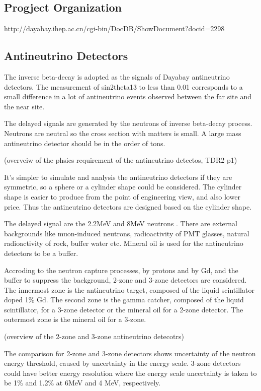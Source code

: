 \subsection{Progject Organization}

http://dayabay.ihep.ac.cn/cgi-bin/DocDB/ShowDocument?docid=2298

\subsection{Antineutrino Detectors}

The inverse beta-decay is adopted as the signals of Dayabay antineutrino detectors.
The measurement of sin2theta13 to less than 0.01 corresponds to a small
difference in a lot of antineutrino events observed between the far site and
the near site.

The delayed signals are generated by the neutrons of inverse beta-decay process.
Neutrons are neutral so the cross section with matters is small.
A large mass antineutrino detector should be in the order of tons.



(overveiw of the phsics requirement of the antineutrino detectos, TDR2 p1)

It's simpler to simulate and analysis the antineutrino detectors if they are
symmetric, so a sphere or a cylinder shape could be considered. The cylinder
shape is easier to produce from the point of engineering view, and also lower
price. Thus the antineutrino detectors are designed based on the cylinder shape.

The delayed signal are the 2.2MeV and 8MeV neutrons . There are external backgrounds like
muon-induced neutrons, radioactivity of PMT glasses, natural radioactivity of rock,
buffer water etc. Mineral oil is used for the antineutrino detectors to be a buffer.

Accroding to the neutron capture processes, by protons and by Gd, and the buffer to
suppress the background, 2-zone and 3-zone detectors are considered. The innermost
zone is the antineutrino target, composed of the liquid scintillator doped 1\% Gd.
The second zone is the gamma catcher, composed of the liquid scintillator, for a
3-zone detector or the mineral oil for a 2-zone detector. The outermost zone
is the mineral oil for a 3-zone.

(overview of the 2-zone and 3-zone antineutrino detecotrs)


The comparison for 2-zone and 3-zone detectors shows 
uncertainty of the neutron energy threshold, caused by uncertainty in the energy scale.
3-zone detectors could have better energy resolution where the energy scale
uncertainty is taken to be 1\% and 1.2\% at 6MeV and 4 MeV, respectively.

